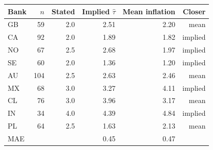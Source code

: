 \begin{tabular}{lrrrrr}\toprule
Bank & $n$ & Stated & Implied $\hat\tau$ & Mean inflation & Closer \\\midrule
GB & 59 & 2.0 & 2.51 & 2.20 & mean\\
CA & 92 & 2.0 & 1.89 & 1.82 & implied\\
NO & 67 & 2.5 & 2.68 & 1.97 & implied\\
SE & 60 & 2.0 & 1.36 & 1.20 & implied\\
AU & 104 & 2.5 & 2.63 & 2.46 & mean\\
MX & 68 & 3.0 & 3.27 & 4.11 & implied\\
CL & 76 & 3.0 & 3.96 & 3.17 & mean\\
IN & 34 & 4.0 & 4.39 & 4.84 & implied\\
PL & 64 & 2.5 & 1.63 & 2.13 & mean\\
\midrule
MAE & & & 0.45 & 0.47 & \\
\bottomrule\end{tabular}